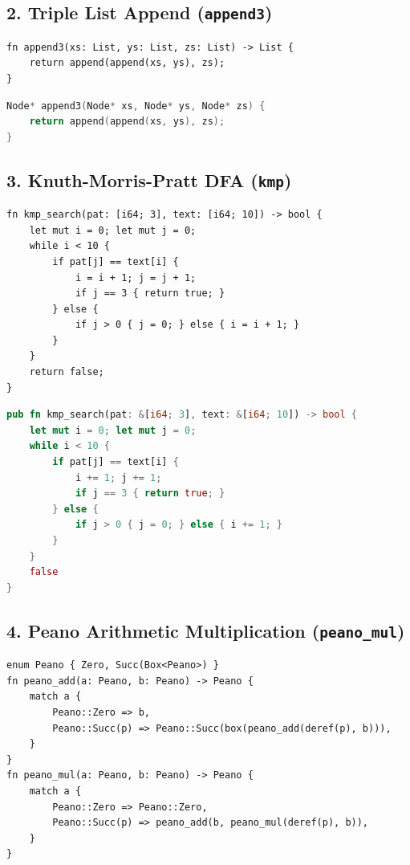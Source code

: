 \subsection{2. Triple List Append (\texttt{append3})}
\begin{lstlisting}[language=NumLang, caption={NumLang Implementation of \texttt{append3}.}]
fn append3(xs: List, ys: List, zs: List) -> List {
    return append(append(xs, ys), zs);
}
\end{lstlisting}

\begin{lstlisting}[language=C, caption={C/C++ Implementation of \texttt{append3}.}]
Node* append3(Node* xs, Node* ys, Node* zs) {
    return append(append(xs, ys), zs);
}
\end{lstlisting}

\subsection{3. Knuth-Morris-Pratt DFA (\texttt{kmp})}
\begin{lstlisting}[language=NumLang, caption={NumLang Pattern Search \texttt{kmp}.}]
fn kmp_search(pat: [i64; 3], text: [i64; 10]) -> bool {
    let mut i = 0; let mut j = 0;
    while i < 10 {
        if pat[j] == text[i] {
            i = i + 1; j = j + 1;
            if j == 3 { return true; }
        } else {
            if j > 0 { j = 0; } else { i = i + 1; }
        }
    }
    return false;
}
\end{lstlisting}

\begin{lstlisting}[language=Rust, caption={Rust Implementation of \texttt{kmp}.}]
pub fn kmp_search(pat: &[i64; 3], text: &[i64; 10]) -> bool {
    let mut i = 0; let mut j = 0;
    while i < 10 {
        if pat[j] == text[i] {
            i += 1; j += 1;
            if j == 3 { return true; }
        } else {
            if j > 0 { j = 0; } else { i += 1; }
        }
    }
    false
}
\end{lstlisting}

\subsection{4. Peano Arithmetic Multiplication (\texttt{peano\_mul})}
\begin{lstlisting}[language=NumLang, caption={NumLang Peano Multiplication.}]
enum Peano { Zero, Succ(Box<Peano>) }
fn peano_add(a: Peano, b: Peano) -> Peano {
    match a {
        Peano::Zero => b,
        Peano::Succ(p) => Peano::Succ(box(peano_add(deref(p), b))),
    }
}
fn peano_mul(a: Peano, b: Peano) -> Peano {
    match a {
        Peano::Zero => Peano::Zero,
        Peano::Succ(p) => peano_add(b, peano_mul(deref(p), b)),
    }
}
\end{lstlisting}


